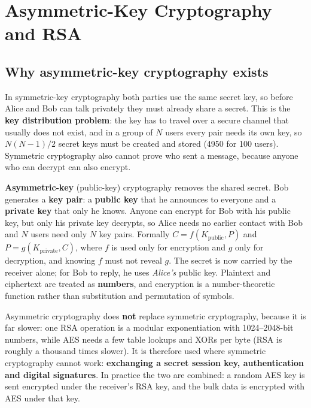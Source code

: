 \section{Asymmetric-Key Cryptography and RSA \new}\label{sec:rsa}

\subsection{Why asymmetric-key cryptography exists \new}

In symmetric-key cryptography both parties use the same secret key, so before Alice and Bob can talk privately they must already share a secret. This is the \textbf{key distribution problem}: the key has to travel over a secure channel that usually does not exist, and in a group of $N$ users every pair needs its own key, so $N(N-1)/2$ secret keys must be created and stored (4950 for 100 users). Symmetric cryptography also cannot prove who sent a message, because anyone who can decrypt can also encrypt.

\textbf{Asymmetric-key} (public-key) cryptography removes the shared secret. Bob generates a \textbf{key pair}: a \textbf{public key} that he announces to everyone and a \textbf{private key} that only he knows.  Anyone can encrypt for Bob with his public key, but only his private key decrypts, so Alice needs no earlier contact with Bob and $N$ users need only $N$ key pairs. Formally $C = f(K_{\text{public}}, P)$ and $P = g(K_{\text{private}}, C)$, where $f$ is used only for encryption and $g$ only for decryption, and knowing $f$ must not reveal $g$. The secret is now carried by the receiver alone; for Bob to reply, he uses \emph{Alice's} public key. Plaintext and ciphertext are treated as \textbf{numbers}, and encryption is a number-theoretic function rather than substitution and permutation of symbols.

Asymmetric cryptography does \textbf{not} replace symmetric cryptography, because it is far slower: one RSA operation is a modular exponentiation with 1024--2048-bit numbers, while AES needs a few table lookups and XORs per byte (RSA is roughly a thousand times slower). It is therefore used where symmetric cryptography cannot work: \textbf{exchanging a secret session key, authentication and digital signatures}. In practice the two are combined: a random AES key is sent encrypted under the receiver's RSA key, and the bulk data is encrypted with AES under that key.

